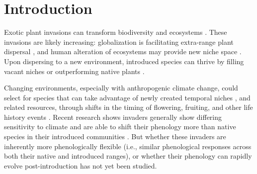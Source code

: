 \documentclass[11pt]{article}\usepackage[]{graphicx}\usepackage[]{color}
\begin{document}
	\section{Introduction} 
	Exotic plant invasions  can transform biodiversity and ecosystems \parencite{Bellard2016, Pejchar2009,Mack2000}. %
These invasions are likely increasing: globalization is facilitating extra-range plant dispersal \parencite{Helmus2014}, and human alteration of ecosystems may provide new niche space \parencite{Tilman2001, Blois2013,Inouye2008,Harte2015}. Upon dispersing to a new environment, introduced species can thrive by filling vacant niches \parencite{Elton1958} or outperforming native plants %
\parencite{Davis2001,Daehler2003}. 

Changing environments, especially with anthropogenic climate change, could select for species that can take advantage of newly created temporal niches \parencite{Wolkovich2011,godoy2014}, and related resources, through shifts in the timing of flowering, fruiting, and other life history events \parencite{Franks2007}. Recent research shows invaders generally show differing sensitivity to climate \parencite{Reeb2020} and are able to shift their phenology more than native species in their introduced communities \parencite{Wolkovich2014,Reeb2020,Zettlemoyer2019}. But whether these invaders are inherently more phenologically flexible (i.e., similar phenological responses across both their native and introduced ranges), or whether their phenology can rapidly evolve post-introduction has not yet been studied.%
\end{document}
